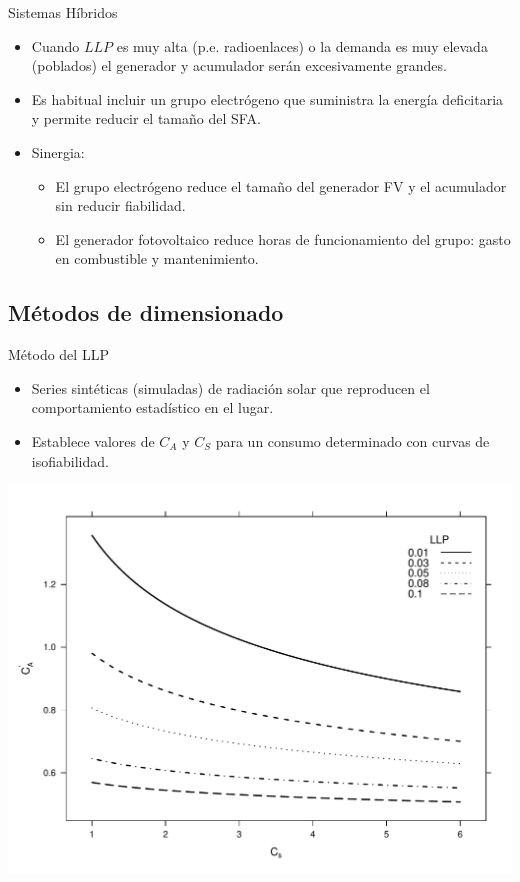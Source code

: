 \documentclass[xcolor={usenames,svgnames,dvipsnames}]{beamer}
\begin{document}
\begin{frame}[label={sec:org3e7efc3}]{Sistemas Híbridos}
\begin{itemize}
\item Cuando \(LLP\) es muy alta (p.e. radioenlaces) o la demanda es muy
elevada (poblados) el generador y acumulador serán excesivamente
grandes.

\item Es habitual incluir un grupo electrógeno que suministra la energía
deficitaria y permite reducir el tamaño del SFA.

\item \alert{Sinergia}:

\begin{itemize}
\item El grupo electrógeno \alert{reduce el tamaño} del \alert{generador FV} y el
\alert{acumulador} sin reducir fiabilidad.

\item El generador fotovoltaico \alert{reduce horas de funcionamiento del grupo}: gasto en combustible y mantenimiento.
\end{itemize}
\end{itemize}
\end{frame}

\subsection{Métodos de dimensionado}
\label{sec:org8ee3e2b}

\begin{frame}[label={sec:org2b38d42}]{Método del LLP}
\begin{itemize}
\item \alert{Series sintéticas} (\guillemotleft{}simuladas\guillemotright{}) de radiación solar que reproducen el comportamiento estadístico en el lugar.
\item Establece valores de \(C_{A}\) y \(C_{S}\) para un consumo determinado con \alert{curvas de isofiabilidad}.
\end{itemize}
\begin{center}
\includegraphics[height=0.65\textheight]{../figs/CurvasLLP.pdf}
\end{center}
\end{frame}
\end{document}
